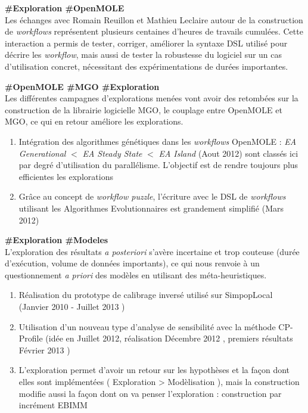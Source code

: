 \begin{myitemize2}
		
\item [1] \textbf{\#Exploration \#OpenMOLE} \\ Les échanges avec Romain Reuillon et Mathieu Leclaire autour de la construction de \textit{workflows} représentent plusieurs centaines d'heures de travails cumulées. Cette interaction a permis de tester, corriger, améliorer la syntaxe DSL utilisé pour décrire les \textit{workflow}, mais aussi de tester la robustesse du logiciel sur un cas d'utilisation concret, nécessitant des expérimentations de durées importantes.

\item[2] \textbf{\#OpenMOLE \#MGO \#Exploration} \\ Les différentes campagnes d'explorations menées vont avoir des retombées sur la construction de la librairie logicielle MGO, le couplage entre OpenMOLE et MGO, ce qui en retour améliore les explorations.

\begin{enumerate}
\item Intégration des algorithmes génétiques dans les \textit{workflows} OpenMOLE : \textit{EA Generational} $<$ \textit{EA Steady State} $<$  \textit{EA Island} (Aout 2012)  sont classés ici par degré d'utilisation du parallélisme. L'objectif est de rendre toujours plus efficientes les explorations 
\item Grâce au concept de \textit{workflow puzzle}, l'écriture avec le DSL de \textit{workflows} utilisant les Algorithmes Evolutionnaires est grandement simplifié (Mars 2012)
\end{enumerate}

\item[3] \textbf{\#Exploration \#Modeles} \\ L'exploration des résultats \textit{a posteriori} s'avère incertaine et trop couteuse (durée d'exécution, volume de données importants), ce qui nous renvoie à un questionnement \textit{a priori} des modèles en utilisant des méta-heuristiques.
\begin{enumerate}
	\item Réalisation du prototype de calibrage inversé utilisé sur SimpopLocal (Janvier 2010 - Juillet 2013 )
	\item Utilisation d'un nouveau type d'analyse de sensibilité avec la méthode CP-Profile (idée en Juillet 2012, réalisation Décembre 2012 , premiers résultats Février 2013 )
	\item L'exploration permet d'avoir un retour sur les hypothèses et la façon dont elles sont implémentées ( Exploration > Modèlisation ), mais la construction modifie aussi la façon dont on va penser l'exploration : construction par incrément EBIMM
\end{enumerate}


\end{myitemize2}

